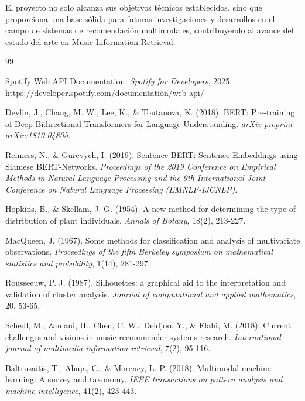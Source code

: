 \documentclass[12pt,a4paper]{report}
\begin{document}
El proyecto no solo alcanza sus objetivos técnicos establecidos, sino que proporciona una base sólida para futuras investigaciones y desarrollos en el campo de sistemas de recomendación multimodales, contribuyendo al avance del estado del arte en Music Information Retrieval.

\begin{thebibliography}{99}

 Spotify Web API Documentation. \textit{Spotify for Developers}, 2025. \url{https://developer.spotify.com/documentation/web-api/}

 Devlin, J., Chang, M. W., Lee, K., \& Toutanova, K. (2018). BERT: Pre-training of Deep Bidirectional Transformers for Language Understanding. \textit{arXiv preprint arXiv:1810.04805}.

 Reimers, N., \& Gurevych, I. (2019). Sentence-BERT: Sentence Embeddings using Siamese BERT-Networks. \textit{Proceedings of the 2019 Conference on Empirical Methods in Natural Language Processing and the 9th International Joint Conference on Natural Language Processing (EMNLP-IJCNLP)}.

 Hopkins, B., \& Skellam, J. G. (1954). A new method for determining the type of distribution of plant individuals. \textit{Annals of Botany}, 18(2), 213-227.

 MacQueen, J. (1967). Some methods for classification and analysis of multivariate observations. \textit{Proceedings of the fifth Berkeley symposium on mathematical statistics and probability}, 1(14), 281-297.

 Rousseeuw, P. J. (1987). Silhouettes: a graphical aid to the interpretation and validation of cluster analysis. \textit{Journal of computational and applied mathematics}, 20, 53-65.

 Schedl, M., Zamani, H., Chen, C. W., Deldjoo, Y., \& Elahi, M. (2018). Current challenges and visions in music recommender systems research. \textit{International journal of multimedia information retrieval}, 7(2), 95-116.

 Baltrusaitis, T., Ahuja, C., \& Morency, L. P. (2018). Multimodal machine learning: A survey and taxonomy. \textit{IEEE transactions on pattern analysis and machine intelligence}, 41(2), 423-443.

\end{thebibliography}
\end{document}
